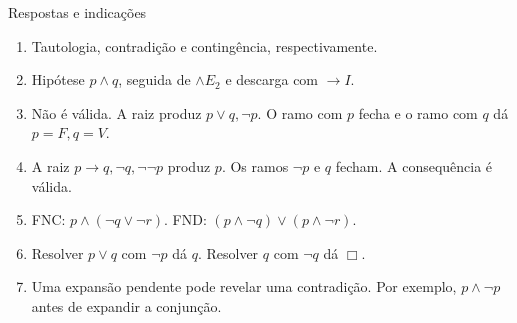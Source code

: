\documentclass[10pt,aspectratio=169]{beamer}
\begin{document}
\begin{frame}{Respostas e indicações}

\small
\begin{enumerate}
\item Tautologia, contradição e contingência, respectivamente.
\item Hipótese $p\land q$, seguida de $\land E_2$ e descarga com $\to I$.
\item Não é válida. A raiz produz $p\lor q,\neg p$. O ramo com $p$ fecha e o ramo com $q$ dá $p=F,q=V$.
\item A raiz $p\to q,\neg q,\neg\neg p$ produz $p$. Os ramos $\neg p$ e $q$ fecham. A consequência é válida.
\item FNC: $p\land(\neg q\lor\neg r)$. FND: $(p\land\neg q)\lor(p\land\neg r)$.
\item Resolver $p\lor q$ com $\neg p$ dá $q$. Resolver $q$ com $\neg q$ dá $\Box$.
\item Uma expansão pendente pode revelar uma contradição. Por exemplo, $p\land\neg p$ antes de expandir a conjunção.
\end{enumerate}
\end{frame}
\end{document}
